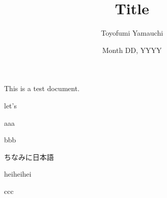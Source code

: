\documentclass{ltjsarticle}
\title{Title}
\author{Toyofumi Yamauchi}
\date{Month DD, YYYY}
\begin{document}
\maketitle

This is a test document.

let's

aaa

bbb

ちなみに日本語

heiheihei

ccc
\end{document}
